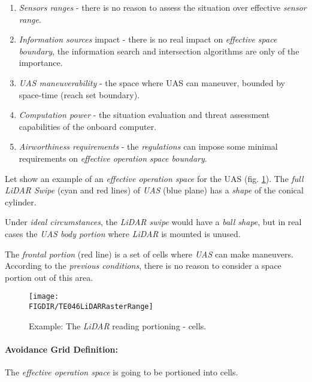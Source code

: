 \begin{enumerate}
        \item \emph{Sensors ranges} -  there is no reason to assess the situation over effective \emph{sensor range}.
        
        \item \emph{Information sources} impact - there is no real impact on \emph{effective space boundary}, the information search and intersection algorithms are only of the importance.
        
        \item \emph{UAS maneuverability} - the space where UAS can maneuver, bounded by space-time (reach set boundary). 
        
        \item \emph{Computation power} - the situation evaluation and threat assessment capabilities of the onboard computer.
        
        \item \emph{Airworthiness requirements} - the \emph{regulations} can impose some minimal requirements on \emph{effective operation space boundary}.
\end{enumerate}

Let show an example of an \emph{effective operation space} for the UAS  (fig. \ref{fig:LidarSpaceSegmentation}).  The \emph{full LiDAR Swipe} (cyan and red lines) of \emph{UAS} (blue plane) has a \emph{shape} of the conical cylinder. 

\begin{note}
Under \emph{ideal circumstances}, the \emph{LiDAR swipe} would have a \emph{ball shape}, but in real cases the \emph{UAS body portion} where \emph{LiDAR} is mounted is unused.
\end{note}

The \emph{frontal portion} (red line) is a set of cells where \emph{UAS} can make maneuvers. According to the \emph{previous conditions}, there is no reason to consider a  space portion out of this area. 

\begin{figure}[H]
    \centering
    \texttt{[image: \\FIGDIR/TE046LiDARRasterRange]} 
    \caption{Example: The \emph{LiDAR} reading portioning - cells.}
    \label{fig:LidarSpaceSegmentation}
\end{figure}

\paragraph{Avoidance Grid Definition:} The \emph{effective operation space} is going to be portioned into cells. 

